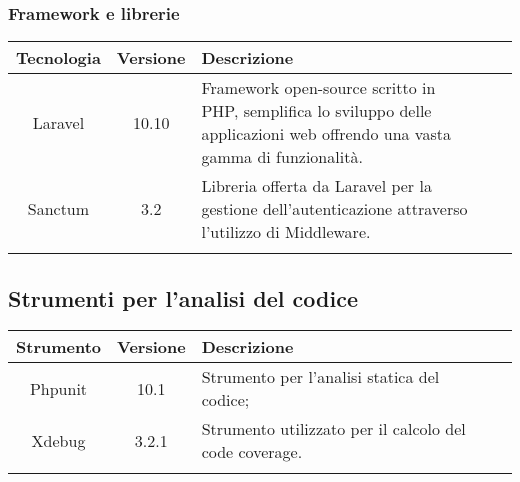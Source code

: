 \subsubsection{Framework e librerie}

\begin{center}
\setlength\extrarowheight{5pt}
\renewcommand\tabularxcolumn[1]{>{\Centering}m{#1}}
\begin{tabularx}{\textwidth}{| c | c | X | X | X |} 
	\hline
	\rowcolor{white}
	\textbf{Tecnologia} & \textbf{Versione} & \textbf{Descrizione}\\
	\hline
	Laravel & 10.10 & Framework open-source scritto in PHP, semplifica lo sviluppo delle applicazioni web offrendo una vasta gamma di funzionalità.\\
	\hline
	Sanctum & 3.2 & Libreria offerta da Laravel per la gestione dell'autenticazione attraverso l'utilizzo di Middleware.\\
	\hline
	\rowcolor{white}
	\caption{Framework e librerie utilizzati}
\end{tabularx}
\end{center}

\subsection{Strumenti per l’analisi del codice}

\begin{center}
\setlength\extrarowheight{5pt}
\renewcommand\tabularxcolumn[1]{>{\Centering}m{#1}}
\begin{tabularx}{\textwidth}{| c | c | X | X | X |} 
	\hline
	\rowcolor{white}
	\textbf{Strumento} & \textbf{Versione} & \textbf{Descrizione}\\
	\hline
	Phpunit & 10.1 & Strumento per l'analisi statica del codice;\\
	\hline
	Xdebug & 3.2.1 & Strumento utilizzato per il calcolo del code coverage.\\
	\hline
	\rowcolor{white}
	\caption{Strumenti per analisi utilizzati}
\end{tabularx}
\end{center}